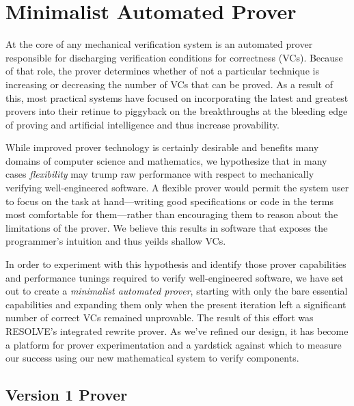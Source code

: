 


\chapter{Minimalist Automated Prover\label{ch:prover}}
At the core of any mechanical verification system is an automated prover responsible for discharging verification conditions for correctness (VCs).  Because of that role, the prover determines whether of not a particular technique is increasing or decreasing the number of VCs that can be proved.  As a result of this, most practical systems have focused on incorporating the latest and greatest provers into their retinue to piggyback on the breakthroughs at the bleeding edge of proving and artificial intelligence and thus increase provability.

While improved prover technology is certainly desirable and benefits many domains of computer science and mathematics, we hypothesize that in many cases \emph{flexibility} may trump raw performance with respect to mechanically verifying well-engineered software.  A flexible prover would permit the system user to focus on the task at hand---writing good specifications or code in the terms most comfortable for them---rather than encouraging them to reason about the limitations of the prover.  We believe this results in software that exposes the programmer's intuition and thus yeilds shallow VCs.

In order to experiment with this hypothesis and identify those prover capabilities and performance tunings required to verify well-engineered software, we have set out to create a \emph{minimalist automated prover}, starting with only the bare essential capabilities and expanding them only when the present iteration left a significant number of correct VCs remained unprovable.  The result of this effort was RESOLVE's integrated rewrite prover.  As we've refined our design, it has become a platform for prover experimentation and a yardstick against which to measure our success using our new mathematical system to verify components.


\section{Version 1 Prover}

